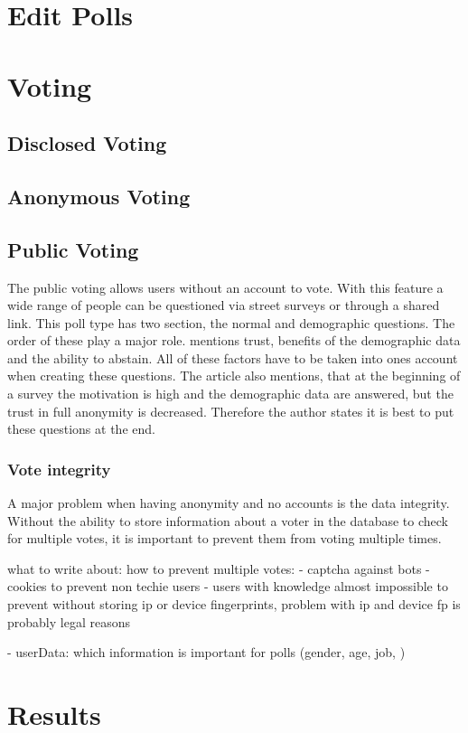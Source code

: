 \documentclass[a4paper,12pt]{report}
\begin{document}
\section{Edit Polls}
\section{Voting}
\subsection{Disclosed Voting}
\subsection{Anonymous Voting}
\subsection{Public Voting}
The public voting allows users without an account to vote. With this feature a wide range of people can be questioned via street surveys or through a shared link. This poll type has two section, the normal and demographic questions. The order of these play a major role. \textcite{demographicdata} mentions trust, benefits of the demographic data and the ability to abstain. All of these factors have to be taken into ones account when creating these questions. The article also mentions, that at the beginning of a survey the motivation is high and the demographic data are answered, but the trust in full anonymity is decreased. Therefore the author states it is best to put these questions at the end. 
\subsubsection{Vote integrity}
A major problem when having anonymity and no accounts is the data integrity. Without the ability to store information about a voter in the database to check for multiple votes, it is important to prevent them from voting multiple times.  

what to write about:
how to prevent multiple votes: 
- 	captcha against bots 
-	cookies to prevent non techie users 
-	users with knowledge almost impossible to prevent without storing ip or device fingerprints, 
problem with ip and device fp is probably legal reasons

-	userData: which information is important for polls (gender, age, job, )

\section{Results}
\end{document}
